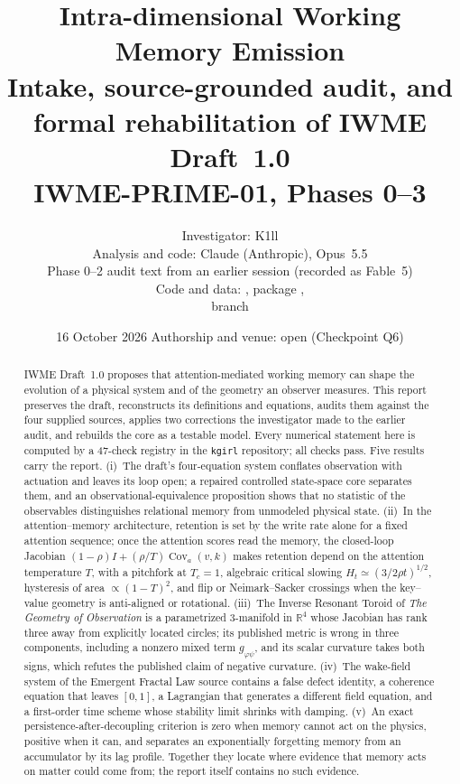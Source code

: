 \documentclass[11pt]{article}
\title{\textbf{Intra-dimensional Working Memory Emission}\\[3pt]
\large Intake, source-grounded audit, and formal rehabilitation of IWME Draft~1.0\\[2pt]
\normalsize IWME-PRIME-01, Phases 0--3}
\author{Investigator: K1ll\\[2pt]
\small Analysis and code: Claude (Anthropic), Opus~5.5\\
\small Phase 0--2 audit text from an earlier session (recorded as Fable~5)\\
\small Code and data: \href{https://github.com/9x25dillon/kgirl}{\code{9x25dillon/kgirl}}, package \code{src/kgirl/iwme},\\
\small branch \code{claude/iwme-phase3}}
\date{16 October 2026 \quad\textperiodcentered\quad Authorship and venue: open (Checkpoint Q6)}
\theoremstyle{definition}
\theoremstyle{remark}
\newcommand{\R}{\mathbb{R}}
\newcommand{\Cov}{\operatorname{Cov}}
\newcommand{\code}[1]{\texttt{#1}}
\begin{document}
\maketitle
\thispagestyle{fancy}

\begin{abstract}
\noindent IWME Draft~1.0 proposes that attention-mediated working memory can shape the evolution of a physical system and of the geometry an observer measures. This report preserves the draft, reconstructs its definitions and equations, audits them against the four supplied sources, applies two corrections the investigator made to the earlier audit, and rebuilds the core as a testable model. Every numerical statement here is computed by a 47-check registry in the \code{kgirl} repository; all checks pass. Five results carry the report. (i)~The draft's four-equation system conflates observation with actuation and leaves its loop open; a repaired controlled state-space core separates them, and an observational-equivalence proposition shows that no statistic of the observables distinguishes relational memory from unmodeled physical state. (ii)~In the attention--memory architecture, retention is set by the write rate alone for a fixed attention sequence; once the attention scores read the memory, the closed-loop Jacobian $(1-\rho)I+(\rho/T)\Cov_a(v,k)$ makes retention depend on the attention temperature $T$, with a pitchfork at $T_c=1$, algebraic critical slowing $H_t\simeq(3/2\rho t)^{1/2}$, hysteresis of area $\propto(1-T)^2$, and flip or Neimark--Sacker crossings when the key--value geometry is anti-aligned or rotational. (iii)~The Inverse Resonant Toroid of \emph{The Geometry of Observation} is a parametrized 3-manifold in $\R^4$ whose Jacobian has rank three away from explicitly located circles; its published metric is wrong in three components, including a nonzero mixed term $g_{\varphi\psi}$, and its scalar curvature takes both signs, which refutes the published claim of negative curvature. (iv)~The wake-field system of the Emergent Fractal Law source contains a false defect identity, a coherence equation that leaves $[0,1]$, a Lagrangian that generates a different field equation, and a first-order time scheme whose stability limit shrinks with damping. (v)~An exact persistence-after-decoupling criterion is zero when memory cannot act on the physics, positive when it can, and separates an exponentially forgetting memory from an accumulator by its lag profile. Together they locate where evidence that memory acts on matter could come from; the report itself contains no such evidence.
\end{abstract}
\end{document}
